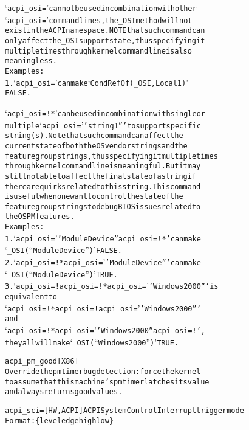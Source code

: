 \documentclass[a4paper,8pt,english]{sphinxmanual}
\begin{document}
\begin{alltt}
                        `acpi\_osi=' cannot be used in combination with other
                        `acpi\_osi=' command lines, the \_OSI method will not
                        exist in the ACPI namespace.  NOTE that such command can
                        only affect the \_OSI support state, thus specifying it
                        multiple times through kernel command line is also
                        meaningless.
                        Examples:
                          1. `acpi\_osi=' can make `CondRefOf(\_OSI, Local1)'
                             FALSE.

                        `acpi\_osi=!*' can be used in combination with single or
                        multiple `acpi\_osi=''string1''' to support specific
                        string(s).  Note that such command can affect the
                        current state of both the OS vendor strings and the
                        feature group strings, thus specifying it multiple times
                        through kernel command line is meaningful.  But it may
                        still not able to affect the final state of a string if
                        there are quirks related to this string.  This command
                        is useful when one want to control the state of the
                        feature group strings to debug BIOS issues related to
                        the OSPM features.
                        Examples:
                          1. `acpi\_osi=''Module Device'' acpi\_osi=!*' can make
                             `\_OSI(``Module Device'')' FALSE.
                          2. `acpi\_osi=!* acpi\_osi=''Module Device''' can make
                             `\_OSI(``Module Device'')' TRUE.
                          3. `acpi\_osi=! acpi\_osi=!* acpi\_osi=''Windows 2000''' is
                             equivalent to
                             `acpi\_osi=!* acpi\_osi=! acpi\_osi=''Windows 2000'''
                             and
                             `acpi\_osi=!* acpi\_osi=''Windows 2000'' acpi\_osi=!',
                             they all will make `\_OSI(``Windows 2000'')' TRUE.

        acpi\_pm\_good    {[}X86{]}
                        Override the pmtimer bug detection: force the kernel
                        to assume that this machine's pmtimer latches its value
                        and always returns good values.

        acpi\_sci=       {[}HW,ACPI{]} ACPI System Control Interrupt trigger mode
                        Format: \{ level \textbar{} edge \textbar{} high \textbar{} low \}


\end{alltt}
\end{document}

